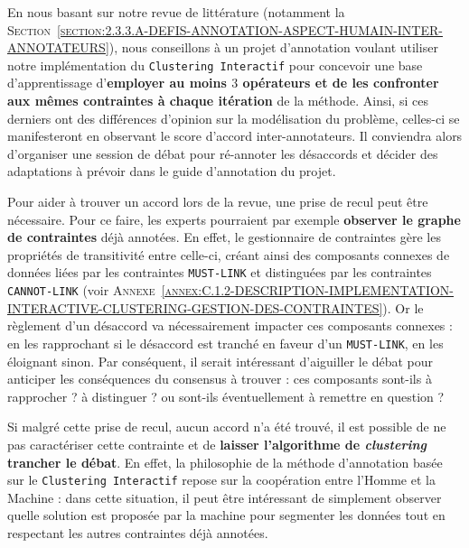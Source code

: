 			En nous basant sur notre revue de littérature (notamment la \textsc{Section~\ref{section:2.3.3.A-DEFIS-ANNOTATION-ASPECT-HUMAIN-INTER-ANNOTATEURS}}), nous conseillons à un projet d'annotation voulant utiliser notre implémentation du \texttt{Clustering Interactif} pour concevoir une base d'apprentissage d'\textbf{employer au moins $3$ opérateurs et de les confronter aux mêmes contraintes à chaque itération} de la méthode.
			Ainsi, si ces derniers ont des différences d'opinion sur la modélisation du problème, celles-ci se manifesteront en observant le score d'accord inter-annotateurs.
			Il conviendra alors d'organiser une session de débat pour ré-annoter les désaccords et décider des adaptations à prévoir dans le guide d'annotation du projet.
			\begin{leftBarIdea}
				Pour aider à trouver un accord lors de la revue, une prise de recul peut être nécessaire.
				Pour ce faire, les experts pourraient par exemple \textbf{observer le graphe de contraintes} déjà annotées.
				En effet, le gestionnaire de contraintes gère les propriétés de transitivité entre celle-ci, créant ainsi des composants connexes de données liées par les contraintes \texttt{MUST-LINK} et distinguées par les contraintes \texttt{CANNOT-LINK} (voir \textsc{Annexe~\ref{annex:C.1.2-DESCRIPTION-IMPLEMENTATION-INTERACTIVE-CLUSTERING-GESTION-DES-CONTRAINTES}}).
				Or le règlement d'un désaccord va nécessairement impacter ces composants connexes : en les rapprochant si le désaccord est tranché en faveur d'un \texttt{MUST-LINK}, en les éloignant sinon.
				Par conséquent, il serait intéressant d'aiguiller le débat pour anticiper les conséquences du consensus à trouver : ces composants sont-ils à rapprocher ? à distinguer ? ou sont-ils 
				éventuellement à remettre en question ?

				Si malgré cette prise de recul, aucun accord n'a été trouvé, il est possible de ne pas caractériser cette contrainte et de \textbf{laisser l'algorithme de \textit{clustering} trancher le débat}.
				En effet, la philosophie de la méthode d'annotation basée sur le \texttt{Clustering Interactif} repose sur la coopération entre l'Homme et la Machine : dans cette situation, il peut être intéressant de simplement observer quelle solution est proposée par la machine pour segmenter les données tout en respectant les autres contraintes déjà annotées.
			\end{leftBarIdea}
			
